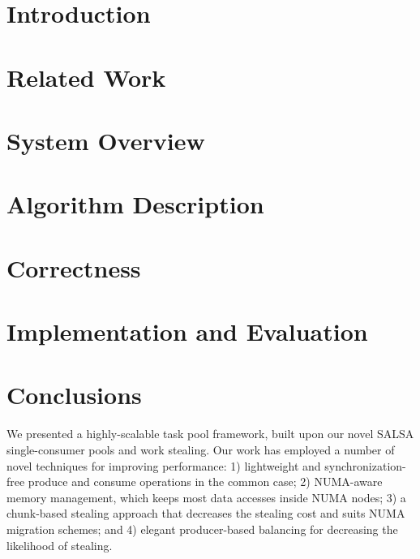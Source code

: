 \documentclass{sig-alternate}
\begin{document}



\section{Introduction}
\label{sec:intro}


\section{Related Work}
\label{sec:related}


\section{System Overview}
\label{sec:system}


\section{Algorithm Description}
\label{sec:algo}


\section{Correctness}
\label{sec:correctness}


\section{Implementation and Evaluation}
\label{sec:evaluation}


\section{Conclusions}
\label{sec:conclusions}
We presented a highly-scalable task pool framework, built upon
our novel SALSA single-consumer pools and work stealing.
Our work has employed a number of novel techniques for improving
performance: 1) lightweight and synchronization-free produce and consume operations in the common case; 
2) NUMA-aware memory management, which keeps most data accesses inside NUMA nodes;
3) a chunk-based stealing approach that decreases the stealing cost and suits NUMA migration schemes; and 4) elegant producer-based
balancing for decreasing the likelihood of stealing.
\end{document}
